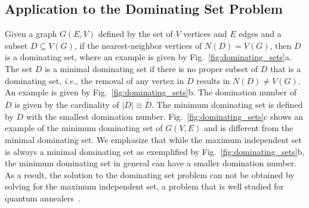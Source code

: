 \documentclass[fleqn,10pt]{wlscirep}
\begin{document}
\subsection{Application to the Dominating Set Problem}
\label{sec:results:mds}

Given a graph $G(E,V)$ defined by the set of $V$ vertices and $E$ edges and a subset $D \subseteq V(G)$, if the nearest-neighbor vertices of $\mathit{N}(D) = V(G)$, then $D$ is a dominating set, where an example is given by Fig.~\ref{fig:dominating_sets}a. The set $D$ is a minimal dominating set if there is no proper subset of $D$ that is a dominating set, {\it{i.e.}}, the removal of any vertex in $D$ results in $N(D) \neq V(G)$. An example is given by Fig.~\ref{fig:dominating_sets}b. The domination number of $D$ is given by the cardinality of $|D| \equiv \overline{\overline{D}}$. The minimum dominating set is defined by $D$ with the smallest domination number. Fig.~\ref{fig:dominating_sets}c shows an example of the minimum dominating set of $G(V, E)$ and is different from the minimal dominating set. We emphasize that while the maximum independent set is always a minimal dominating set as exemplified by Fig.~\ref{fig:dominating_sets}b, the minimum dominating set in general can have a smaller domination number. As a result, the solution to the dominating set problem can not be obtained by solving for the maximum independent set, a problem that is well studied for quantum annealers~\cite{}.
\end{document}
